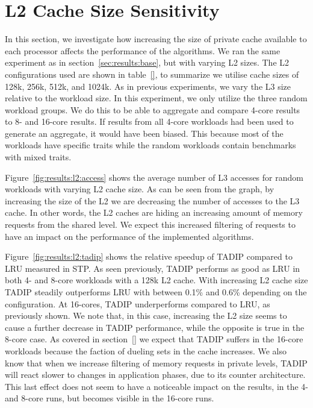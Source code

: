 \section{L2 Cache Size Sensitivity}
\label{sec:results:l2size_sensitivity}


In this section, we investigate how increasing the size of private cache available to each processor affects the performance of the algorithms.
We ran the same experiment as in section~\ref{sec:results:base}, but with varying L2 sizes.
The L2 configurations used are shown in table~\ref{}\todo{}, to summarize we utilise cache sizes of 128k, 256k, 512k, and 1024k.
As in previous experiments, we vary the L3 size relative to the workload size.
In this experiment, we only utilize the three random workload groups.
We do this to be able to aggregate and compare 4-core results to 8- and 16-core results.
If results from all 4-core workloads had been used to generate an aggregate, it would have been biased.
This because most of the workloads have specific traits while the random workloads contain benchmarks with mixed traits.

Figure~\ref{fig:results:l2:access} shows the average number of L3 accesses for random workloads with varying L2 cache size.
As can be seen from the graph, by increasing the size of the L2 we are decreasing the number of accesses to the L3 cache.
In other words, the L2 caches are hiding an increasing amount of memory requests from the shared level.
We expect this increased filtering of requests to have an impact on the performance of the implemented algorithms.

Figure~\ref{fig:results:l2:tadip} shows the relative speedup of TADIP compared to LRU measured in STP. 
As seen previously, TADIP performs as good as LRU in both 4- and 8-core workloads with a 128k L2 cache.
With increasing L2 cache size TADIP steadily outperforms LRU with between 0.1\% and 0.6\% depending on the configuration. 
At 16-cores, TADIP underperforms compared to LRU, as previously shown.
We note that, in this case, increasing the L2 size seems to cause a further decrease in TADIP performance, while the opposite is true in the 8-core case.
As covered in section~\ref{} we expect that TADIP suffers in the 16-core workloads because the faction of dueling sets in the cache increases.
We also know that when we increase filtering of memory requests in private levels, TADIP will react slower to changes in application phases, due to its counter architecture.
This last effect does not seem to have a noticeable impact on the results, in the 4- and 8-core runs, but becomes visible in the 16-core runs.

